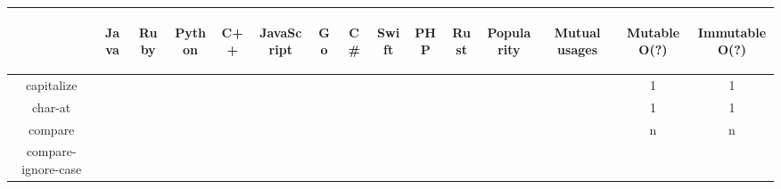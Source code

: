 \documentclass[anonymous,sigplan,review,11pt,nonacm,natbib=false]{acmart}
\begin{document}
    \begin{table*}[]
        \centering
        \begin{tabular}{|c||c|c|c|c|c|c|c|c|c|c|c|c|c|c|}
            \hline
            & \begin{sideways}Java\end{sideways}
            & \begin{sideways}Ruby\end{sideways}
            & \begin{sideways}Python\end{sideways}
            & \begin{sideways}C++\end{sideways}
            & \begin{sideways}JavaScript\end{sideways}
            & \begin{sideways}Go\end{sideways}
            & \begin{sideways}C\#\end{sideways}
            & \begin{sideways}Swift\end{sideways}
            & \begin{sideways}PHP\end{sideways}
            & \begin{sideways}Rust\end{sideways}
            & \begin{sideways}Popularity\end{sideways}
            & \begin{sideways}Mutual usages\end{sideways}
            & \begin{sideways}Mutable O(?)\end{sideways}
            & \begin{sideways}Immutable O(?)\end{sideways}
            \\ \hline \hline
            capitalize &  &  &  &  &  &  &  &  &  &  &  &  & 1 & 1 \\ \hline

            char-at &  &  &  &  &  &  &  &  &  &  &  &  & 1 & 1 \\ \hline

            compare &  &  &  &  &  &  &  &  &  &  &  &  & n & n \\ \hline

            compare-ignore-case &  &  &  &  &  &  &  &  &  &  &  &  &  & \\ \hline


\end{tabular}
\end{table*}
\end{document}

